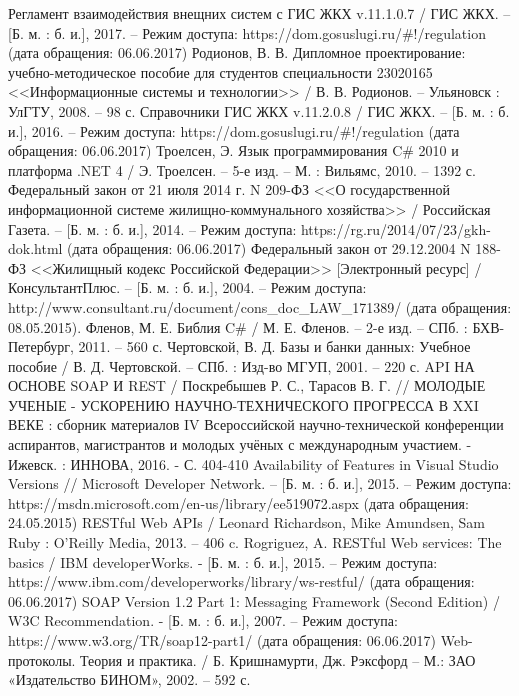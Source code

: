 \begin{thebibliography}{99}
	 Регламент взаимодействия внещних систем с ГИС ЖКХ v.11.1.0.7 / ГИС ЖКХ. – [Б. м. : б. и.], 2017. – Режим доступа: https://dom.gosuslugi.ru/\#!/regulation (дата обращения: 06.06.2017)
	 Родионов, В. В. Дипломное проектирование: учебно-методическое пособие для студентов специальности 23020165 <<Информационные системы и технологии>> / В. В. Родионов. – Ульяновск : УлГТУ, 2008. – 98 с.
	 Справочники ГИС ЖКХ v.11.2.0.8 / ГИС ЖКХ. – [Б. м. : б. и.], 2016. – Режим доступа: https://dom.gosuslugi.ru/\#!/regulation (дата обращения: 06.06.2017)
	 Троелсен, Э. Язык программирования C\# 2010 и платформа .NET 4 / Э. Троелсен. – 5-е изд. – М. : Вильямс, 2010. – 1392 с.
	 Федеральный закон от 21 июля 2014 г. N 209-ФЗ <<О государственной информационной системе жилищно-коммунального хозяйства>> / Российская Газета. – [Б. м. : б. и.], 2014. – Режим доступа: https://rg.ru/2014/07/23/gkh-dok.html (дата обращения: 06.06.2017)
	 Федеральный закон от 29.12.2004 N 188-ФЗ <<Жилищный кодекс Российской Федерации>> [Электронный ресурс] / КонсультантПлюс. – [Б. м. : б. и.], 2004. – Режим доступа: http://www.consultant.ru/document/cons\_doc\_LAW\_171389/ (дата обращения: 08.05.2015).
	 Фленов, М. Е. Библия C\# / М. Е. Фленов. – 2-е изд. – СПб. : БХВ-Петербург, 2011. – 560 с.
	 Чертовской, В. Д. Базы и банки данных: Учебное пособие / В. Д. Чертовской. – СПб. : Изд-во МГУП, 2001. –  220 с.
	 API НА ОСНОВЕ SOAP И REST / Поскребышев Р. С., Тарасов В. Г. // МОЛОДЫЕ УЧЕНЫЕ - УСКОРЕНИЮ НАУЧНО-ТЕХНИЧЕСКОГО ПРОГРЕССА В XXI ВЕКЕ : сборник материалов IV Всероссийской научно-технической конференции аспирантов, магистрантов и молодых учёных с международным участием. - Ижевск. : ИННОВА, 2016. - С. 404-410
	 Availability of Features in Visual Studio Versions // Microsoft Developer Network. – [Б. м. : б. и.], 2015. – Режим доступа: https://msdn.microsoft.com/en-us/library/ee519072.aspx (дата обращения: 24.05.2015)
	 RESTful Web APIs / Leonard Richardson, Mike Amundsen, Sam Ruby : O'Reilly Media, 2013. – 406 c.
	 Rogriguez, A. RESTful Web services: The basics / IBM developerWorks. - [Б. м. : б. и.], 2015. – Режим доступа: https://www.ibm.com/developerworks/library/ws-restful/ (дата обращения: 06.06.2017)
	 SOAP Version 1.2 Part 1: Messaging Framework (Second Edition) / W3C Recommendation. - [Б. м. : б. и.], 2007. – Режим доступа: https://www.w3.org/TR/soap12-part1/ (дата обращения: 06.06.2017)
	 Web-протоколы. Теория и практика. / Б. Кришнамурти, Дж. Рэксфорд – М.: ЗАО «Издательство БИНОМ», 2002. – 592 с.
\end{thebibliography}


\clearpage
\newpage